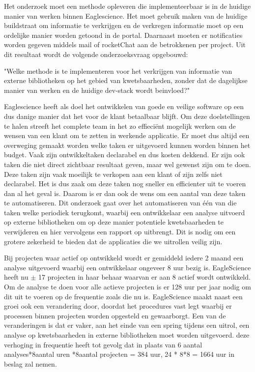 Het onderzoek moet een methode opleveren die implementeerbaar is in de huidige manier van werken binnen Eaglescience. Het moet gebruik maken van de huidige buildstraat om informatie te verkrijgen en de verkregen informatie moet op een ordelijke manier worden getoond in de portal. Daarnaast moeten er notificaties worden gegeven middels mail of rocketChat aan de betrokkenen per project. Uit dit resultaat wordt de volgende onderzoeksvraag opgebouwd:

"Welke methode is te implementeren voor het verkrijgen van informatie van externe bibliotheken op het gebied van kwetsbaarheden, zonder dat de dagelijkse manier van werken en de huidige dev-stack wordt beinvloed?"

Eaglescience heeft als doel het ontwikkelen van goede en veilige software op een dus danige manier dat het voor de klant betaalbaar blijft. Om deze doelstellingen te halen streeft het complete team in het zo effieciënt mogelijk werken om de wensen van een klant om te zetten in werkende applicatie. Er moet dus altijd een overweging gemaakt worden welke taken er uitgevoerd kunnen worden binnen het budget. Vaak zijn ontwikkeltaken declarabel en dus kosten dekkend. Er zijn ook taken die niet direct zichtbaar resultaat geven, maar wel gewenst zijn om te doen. Deze taken zijn vaak moeilijk te verkopen aan een klant of zijn zelfs niet declarabel. Het is dus zaak om deze taken nog sneller en efficienter uit te voeren dan al het geval is. Daarom is er dan ook de wens om een aantal van deze taken te automatiseren. Dit onderzoek gaat over het automatiseren van één van die taken welke periodiek terugkomt, waarbij een ontwikkelaar een analyse uitvoerd op externe bibliotheken om op deze manier potentiele kwetsbaarheden te verwijderen en hier vervolgens een rapport op uitbrengt. Dit is nodig om een grotere zekerheid te bieden dat de applicaties die we uitrollen veilig zijn.

Bij projecten waar actief op ontwikkeld wordt er gemiddeld iedere 2 maand een analyse uitgevoerd waarbij een ontwikkelaar ongeveer 8 uur bezig is. EagleScience heeft nu $\pm$ 17 projecten in haar behaar waarvan er aan 8 actief wordt ontwikkeld. Om de analyse te doen voor alle actieve projecten is er 128 uur per jaar nodig om dit uit te voeren op de frequentie zoals die nu is. EagleScience maakt naast een groei ook een verandering door, doordat het procedures vast legt waarbij er processen binnen projecten worden opgesteld en gewaarborgt. Een van de veranderingen is dat er vaker, aan het einde van een spring tijdens een uitrol, een analyse op kwetsbaarheden in externe bibliotheken moet worden uitgevoerd. deze verhoging in frequentie heeft tot gevolg dat in plaats van 6 aantal analyses*8aantal uren *8aantal projecten  = 384 uur,  24 * 8*8 = 1664 uur in beslag zal nemen.

